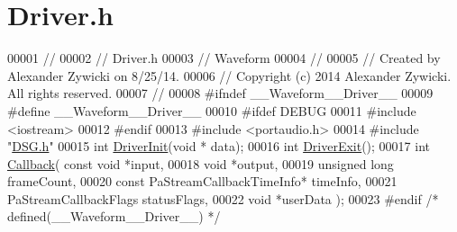 \hypertarget{_driver_8h_source}{\section{Driver.\+h}
\label{_driver_8h_source}
}

\begin{DoxyCode}
00001 \textcolor{comment}{//}
00002 \textcolor{comment}{//  Driver.h}
00003 \textcolor{comment}{//  Waveform}
00004 \textcolor{comment}{//}
00005 \textcolor{comment}{//  Created by Alexander Zywicki on 8/25/14.}
00006 \textcolor{comment}{//  Copyright (c) 2014 Alexander Zywicki. All rights reserved.}
00007 \textcolor{comment}{//}
00008 \textcolor{preprocessor}{#ifndef \_\_Waveform\_\_Driver\_\_}
00009 \textcolor{preprocessor}{#define \_\_Waveform\_\_Driver\_\_}
00010 \textcolor{preprocessor}{#ifdef DEBUG}
00011 \textcolor{preprocessor}{#include <iostream>}
00012 \textcolor{preprocessor}{#endif}
00013 \textcolor{preprocessor}{#include <portaudio.h>}
00014 \textcolor{preprocessor}{#include "\hyperlink{_d_s_g_8h}{DSG.h}"}
00015 \textcolor{keywordtype}{int} \hyperlink{_driver_8h_a70105fa3a575041357534257c1bd91a7}{DriverInit}(\textcolor{keywordtype}{void} * data);
00016 \textcolor{keywordtype}{int} \hyperlink{_driver_8h_a0e985fca408fe471f534ee98a2bd5733}{DriverExit}();
00017 \textcolor{keywordtype}{int} \hyperlink{_driver_8h_a110986770da2cd49dcf3789f8cc09c28}{Callback}( \textcolor{keyword}{const} \textcolor{keywordtype}{void} *input,
00018              \textcolor{keywordtype}{void} *output,
00019              \textcolor{keywordtype}{unsigned} \textcolor{keywordtype}{long} frameCount,
00020              \textcolor{keyword}{const} PaStreamCallbackTimeInfo* timeInfo,
00021              PaStreamCallbackFlags statusFlags,
00022              \textcolor{keywordtype}{void} *userData );
00023 \textcolor{preprocessor}{#endif }\textcolor{comment}{/* defined(\_\_Waveform\_\_Driver\_\_) */}\textcolor{preprocessor}{}
\end{DoxyCode}
